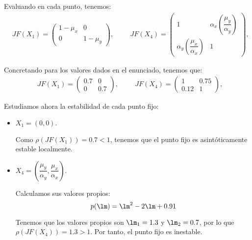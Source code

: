 \begin{ejercicio}
    Evaluando en cada punto, tenemos:
    \begin{align*}
        &JF(X_1) = \begin{pmatrix}
            1-\mu_x & 0\\
            0 & 1-\mu_y
        \end{pmatrix},\hspace{1cm}
        JF(X_4) = \begin{pmatrix}
            1 & \alpha_x\left(\dfrac{\mu_y}{\alpha_y}\right)\\
            \alpha_y\left(\dfrac{\mu_x}{\alpha_x}\right) & 1
        \end{pmatrix},
    \end{align*}

    Concretando para los valores dados en el enunciado, tenemos que:
    \begin{align*}
        &JF(X_1) = \begin{pmatrix}
            0.7 & 0\\
            0 & 0.7
        \end{pmatrix},\hspace{1cm}
        JF(X_4) = \begin{pmatrix}
            1 & 0.75\\
            0.12 & 1
        \end{pmatrix},
    \end{align*}

    Estudiamos ahora la estabilidad de cada punto fijo:
    \begin{itemize}
        \item $X_1=(0,0)$.
        
        Como $\rho(JF(X_1)) = 0.7<1$, tenemos que el punto fijo es asintóticamente estable localmente.

        \item $X_4=\left(\dfrac{\mu_y}{\alpha_y},\dfrac{\mu_x}{\alpha_x}\right)$.
        
        Calculamos sus valores propios:
        \begin{equation*}
            p(\lm) = \lm^2 - 2\lm +0.91
        \end{equation*}

        Tenemos que los valores propios son $\lm_1=1.3$ y $\lm_2=0.7$,
        por lo que $\rho(JF(X_4)) =1.3>1$. Por tanto, el punto fijo es inestable.
    \end{itemize}
\end{ejercicio}

